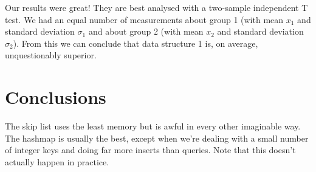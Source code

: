 \documentclass[12pt,a4paper]{article}
\begin{document}
	Our results were great!  They are best analysed with a two-sample independent T test.  We had an
	equal number of measurements about group 1 (with mean $x_1$ and standard deviation $\sigma_1$ and
	about group 2 (with mean $x_2$ and standard deviation $\sigma_2$).  From this we can conclude that
	data structure 1 is, on average, unquestionably superior.


    \section{Conclusions}

    The skip list uses the least memory but is awful in every other imaginable way.  The hashmap is
    usually the best, except when we're dealing with a small number of integer keys and doing far more
    inserts than queries.  Note that this doesn't actually happen in practice.

    

    
\end{document}
